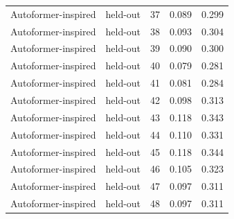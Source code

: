 \begin{tabular}{llrrr}
Autoformer-inspired & held-out & 37 & 0.089 & 0.299 \\
Autoformer-inspired & held-out & 38 & 0.093 & 0.304 \\
Autoformer-inspired & held-out & 39 & 0.090 & 0.300 \\
Autoformer-inspired & held-out & 40 & 0.079 & 0.281 \\
Autoformer-inspired & held-out & 41 & 0.081 & 0.284 \\
Autoformer-inspired & held-out & 42 & 0.098 & 0.313 \\
Autoformer-inspired & held-out & 43 & 0.118 & 0.343 \\
Autoformer-inspired & held-out & 44 & 0.110 & 0.331 \\
Autoformer-inspired & held-out & 45 & 0.118 & 0.344 \\
Autoformer-inspired & held-out & 46 & 0.105 & 0.323 \\
Autoformer-inspired & held-out & 47 & 0.097 & 0.311 \\
Autoformer-inspired & held-out & 48 & 0.097 & 0.311 \\
\bottomrule
\end{tabular}
